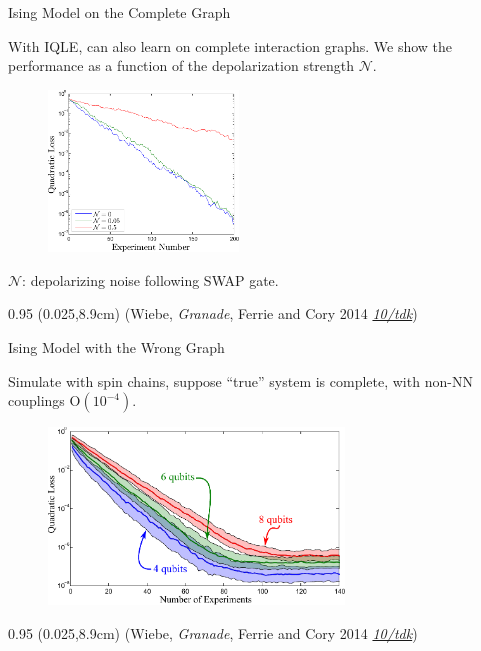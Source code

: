 \documentclass[xcolor=dvipsnames, compress]{beamer}
\renewcommand\UrlFont{\color{red}\rmfamily\itshape}
\newcommand{\shortdoi}[1]{\href{http://doi.org/#1}{\UrlFont 10/#1}}
\newcommand{\OO}{\mathrm{O}}
\newcommand{\bottomnote}[1]{
  \begin{textblock*}{0.95\paperwidth} (0.025\paperwidth,8.9cm)
    {\tiny \hfill #1}
  \end{textblock*}
}
\begin{document}
\begin{frame}{Ising Model on the Complete Graph}
    
    With IQLE, can also learn on complete interaction graphs.
    We show the performance as a function of
    the depolarization strength $\mathcal{N}$.
    
    \begin{figure}
      \centering
      \includegraphics[width=0.45\textwidth]{figures/tpnoise}
    \end{figure}

    $\mathcal{N}$: depolarizing noise following SWAP gate.

  \bottomnote{(Wiebe, \emph{Granade}, Ferrie and Cory 2014 \shortdoi{tdk})}
    
\end{frame}

\begin{frame}{Ising Model with the Wrong Graph}

  Simulate with spin chains, suppose ``true'' system is complete,
  with non-NN couplings $\OO(10^{-4})$.

  \begin{figure}
    \centering
    \includegraphics[width=0.7\textwidth]{figures/badmodel}
  \end{figure}

  \bottomnote{(Wiebe, \emph{Granade}, Ferrie and Cory 2014 \shortdoi{tdk})}

\end{frame}
\end{document}
